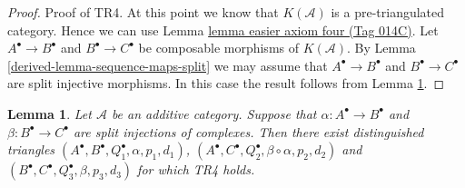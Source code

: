 \documentclass{amsart}
\theoremstyle{plain}
\newtheorem{lemma}[subsection]{Lemma}
\theoremstyle{definition}
\theoremstyle{remark}
\numberwithin{equation}{subsection}
\begin{document}
\begin{proof}
\medskip\noindent
Proof of TR4. At this point we know that $K(\mathcal{A})$
is a pre-triangulated category. Hence we can use
Lemma \href{https://stacks.math.columbia.edu/tag/014C}{lemma easier axiom four (Tag 014C)}. Let $A^\bullet \to B^\bullet$
and $B^\bullet \to C^\bullet$ be composable morphisms of
$K(\mathcal{A})$. By Lemma \ref{derived-lemma-sequence-maps-split} we may assume that
$A^\bullet \to B^\bullet$ and $B^\bullet \to C^\bullet$
are split injective morphisms. In this case the result follows
from Lemma \ref{derived-lemma-two-split-injections}.
\end{proof}


\begin{lemma}
\label{derived-lemma-two-split-injections}
Let $\mathcal{A}$ be an additive category. Suppose that
$\alpha : A^\bullet \to B^\bullet$ and $\beta : B^\bullet \to C^\bullet$
are split injections of complexes. Then there exist distinguished triangles
$(A^\bullet, B^\bullet, Q_1^\bullet, \alpha, p_1, d_1)$,
$(A^\bullet, C^\bullet, Q_2^\bullet, \beta \circ \alpha, p_2, d_2)$
and
$(B^\bullet, C^\bullet, Q_3^\bullet, \beta, p_3, d_3)$
for which TR4 holds.
\end{lemma}
\end{document}
